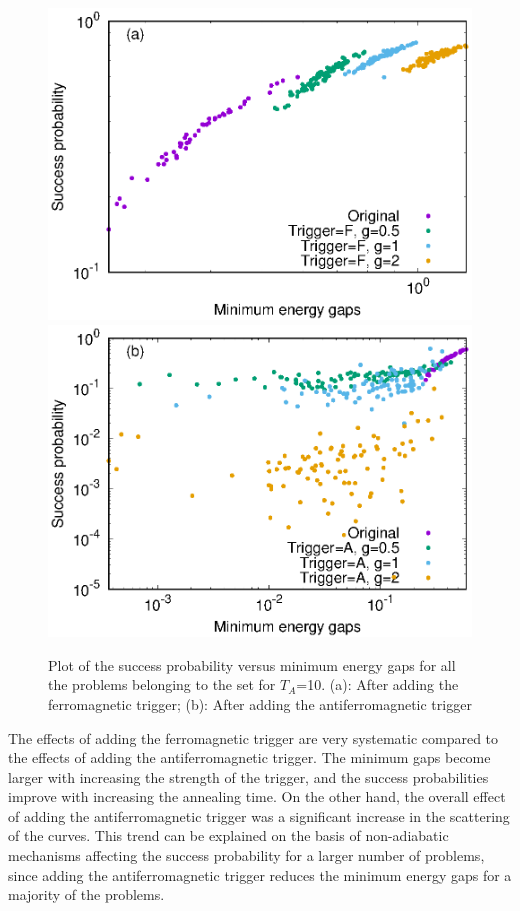 \documentclass[../main.tex]{subfiles}
\begin{document}
\begin{appendices}
\begin{figure}
\centering 
\includegraphics[scale=0.8]{SuccVsGap_F_8.eps}
\includegraphics[scale=0.8]{SuccVsGap_A_8.eps}
\caption{Plot of the success probability versus minimum energy gaps for all the problems belonging to the set for $T_A$=10. (a): After adding the ferromagnetic trigger; (b): After adding the antiferromagnetic trigger }
\label{fig:ap5}
\end{figure}
The effects of adding the ferromagnetic trigger are very systematic compared to the effects of adding the antiferromagnetic trigger. The minimum gaps become larger with increasing the strength of the trigger, and the success probabilities improve with increasing the annealing time. On the other hand, the overall effect of adding the antiferromagnetic trigger was a significant increase in the scattering of the curves. This trend can be explained on the basis of non-adiabatic mechanisms affecting the success probability for a larger number of problems, since adding the antiferromagnetic trigger reduces the minimum energy gaps for a majority of the problems.


\end{appendices}
\end{document}
